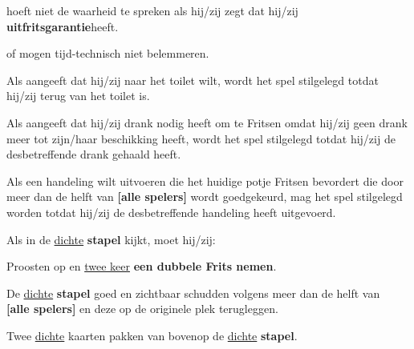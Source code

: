 \vervolgLijst{}
    \item \EenSpeler hoeft niet de waarheid te spreken als hij/zij zegt dat hij/zij \textbf{uitfritsgarantie}\footnotemark[2] heeft.
\eindLijst{}   

\vervolgLijst{}
    \item \Frits of \Willem mogen \medeSpelers tijd-technisch niet belemmeren. 
\eindLijst{}   


\newpage
{}


\vervolgLijst{}
    \item Als \eenSpeler aangeeft dat hij/zij naar het toilet wilt, wordt het spel stilgelegd totdat hij/zij terug van het toilet is.
    \label{regel:stilleggen_1}
\eindLijst{}   

\vervolgLijst{}
    \item Als \eenSpeler aangeeft dat hij/zij drank nodig heeft om te Fritsen omdat hij/zij geen drank meer tot zijn/haar beschikking heeft, wordt het spel stilgelegd totdat hij/zij de desbetreffende drank gehaald heeft.
    \label{regel:stilleggen_2}
\eindLijst{}   

\vervolgLijst{}
    \item Als \eenSpeler een handeling wilt uitvoeren die het huidige potje Fritsen bevordert die door meer dan de helft van \textbf{[alle spelers]} wordt goedgekeurd, mag het spel stilgelegd worden totdat hij/zij de desbetreffende handeling heeft uitgevoerd.
    \label{regel:stilleggen_3}
\eindLijst{}  


\vervolgLijst{}
    \item Als \eenSpeler in de \ul{dichte} \textbf{stapel} kijkt, moet hij/zij:
    \puntLijst{}
        \item Proosten op  en \ul{twee keer} \textbf{een dubbele Frits nemen}\footnotemark[2]. 
        \item De \ul{dichte} \textbf{stapel} goed en zichtbaar schudden volgens meer dan de helft van \\ \textbf{[alle spelers]} en deze op de originele plek terugleggen.
        \item Twee \ul{dichte} kaarten pakken van bovenop de \ul{dichte} \textbf{stapel}.
    \eindPuntLijst{}
    \label{regel:kijken_in_dichte_stapel}
\eindLijst{}  

